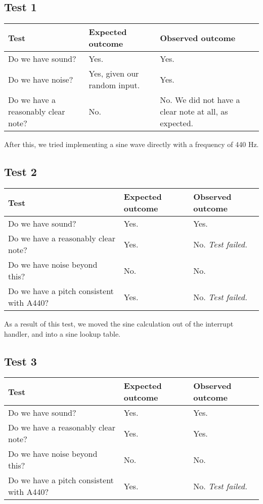 \subsection*{Test 1}
\begin{center}
\begin{tabular}{|p{3.6cm}|p{3.6cm}|p{3.6cm}|}
\hline
{\sc Test} & {\sc Expected outcome} & {\sc Observed outcome}\\ \hline
Do we have sound? & Yes. & Yes.\\ \hline
Do we have noise? & Yes, given our random input. & Yes. \\ \hline
Do we have a reasonably clear note? & No. & No. We did not have a clear note at all, as expected.\\ \hline
\end{tabular}
\end{center}
After this, we tried implementing a sine wave directly with a frequency
of 440 Hz.
\subsection*{Test 2}
\begin{center}
\begin{tabular}{|p{3.6cm}|p{3.6cm}|p{3.6cm}|}
\hline
{\sc Test} & {\sc Expected outcome} & {\sc Observed outcome}\\ \hline
Do we have sound? & Yes. & Yes. \\ \hline
Do we have a reasonably clear note? & Yes. & No. {\em Test failed.} \\ \hline
Do we have noise beyond this? & No. & No. \\ \hline
Do we have a pitch consistent with A440? & Yes. & No. {\em Test failed.} \\
\hline
\end{tabular}
\end{center}

As a result of this test, we moved the sine calculation out of the
interrupt handler, and into a sine lookup table.
\subsection*{Test 3}
\begin{center}
\begin{tabular}{|p{3.6cm}|p{3.6cm}|p{3.6cm}|}
\hline
{\sc Test} & {\sc Expected outcome} & {\sc Observed outcome}\\ \hline
Do we have sound? & Yes. & Yes. \\ \hline
Do we have a reasonably clear note? & Yes. & Yes. \\ \hline
Do we have noise beyond this? & No. & No. \\ \hline
Do we have a pitch consistent with A440? & Yes. & No. {\em Test failed.} \\
\hline
\end{tabular}
\end{center}

